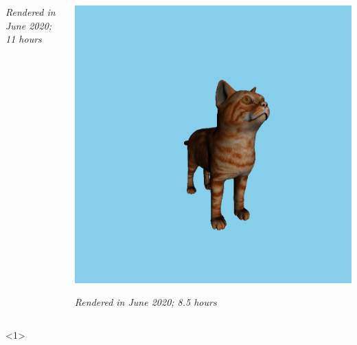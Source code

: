 \documentclass{beamer}
\begin{document}
\begin{frame}
{\begin{columns}[T]
\begin{column}{0.5\textwidth}
				\textit{Rendered in June 2020; 11 hours}
			\end{column}
			\begin{column}{0.5\textwidth}
				\centering
				\includegraphics[width=\textwidth]{media/cat_sqr.jpg}
	
				\textit{Rendered in June 2020; 8.5 hours}
			\end{column}
		\end{columns}
	}<1>
\end{frame}
\end{document}
